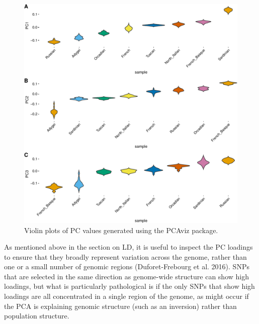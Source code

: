 \documentclass[smallextended]{svjour3}       %
\begin{document}
\begin{figure}
\includegraphics[width=1\linewidth]{plot/unnamed-chunk-21-1} \caption{Violin plots of PC values generated using the PCAviz package.}\label{fig:unnamed-chunk-21}
\end{figure}

As mentioned above in the section on LD, it is useful to inspect the PC
loadings to ensure that they broadly represent variation across the
genome, rather than one or a small number of genomic regions
(Duforet-Frebourg et al. 2016). SNPs that are selected in the same
direction as genome-wide structure can show high loadings, but what is
particularly pathological is if the only SNPs that show high loadings
are all concentrated in a single region of the genome, as might occur if
the PCA is explaining genomic structure (such as an inversion) rather
than population structure.
\end{document}

